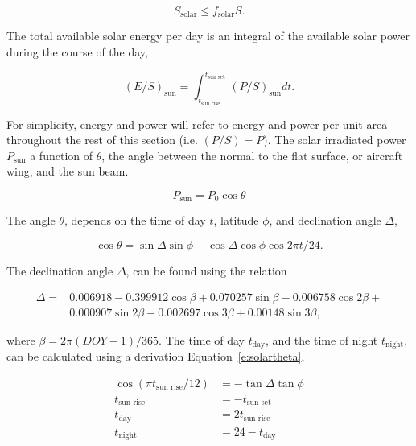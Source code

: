 \documentclass[]{aiaa-tc}%
\begin{document}
\begin{equation}
    \label{e:solarssolar}
    S_{\text{solar}} \leq f_{\text{solar}}S.
\end{equation}

The total available solar energy per day is an integral of the available solar power during the course of the day,

    \begin{equation}
        \label{e:solares}
        (E/S)_{\text{sun}} = \int_{t_{\text{sun rise}}}^{t_{\text{sun set}}} (P/S)_{\text{sun}} dt.
    \end{equation}
    
For simplicity, energy and power will refer to energy and power per unit area throughout the rest of this section (i.e. $(P/S) = P$). 
The solar irradiated power $P_{\text{sun}}$ a function of $\theta$, the angle between the normal to the flat surface, or aircraft wing, and the sun beam.\cite{solar}

\begin{equation}
    \label{e:solarp}
    P_{\text{sun}} = P_0 \cos{\theta}
\end{equation}

The angle $\theta$, depends on the time of day $t$, latitude $\phi$, and declination angle $\Delta$,\cite{solar}

    \begin{equation}
        \label{e:solartheta}
        \cos{\theta} = \sin{\Delta} \sin{\phi} + \cos{\Delta} \cos{\phi} \cos{2\pi t/24}.
    \end{equation}

 The declination angle $\Delta$, can be found using the relation\cite{solar} 

    \begin{align}
        \label{e:solardelta}
        \Delta = &0.006918 - 0.399912 \cos{\beta} + 0.070257\sin{\beta} - 0.006758\cos{2\beta} + \nonumber \\
        & 0.000907\sin{2\beta} - 0.002697\cos{3\beta} + 0.00148\sin{3\beta},
    \end{align}

    where $\beta = 2\pi (DOY-1)/365$.
    The time of day $t_{\text{day}}$, and the time of night $t_{\text{night}}$, can be calculated using a derivation Equation~\eqref{e:solartheta}, \cite{solar}

    \begin{align}
        \label{e:solartday}
        \cos{(\pi t_{\text{sun rise}}/12)} &= -\tan{\Delta} \tan{\phi} \\
        \label{e:solarsunrise}
        t_{\text{sun rise}} &= -t_{\text{sun set}} \\
        \label{e:solartday2}
        t_{\text{day}} &= 2t_{\text{sun rise}} \\
        \label{e:solartnight}
        t_{\text{night}} &= 24 - t_{\text{day}}
    \end{align}
\end{document}
